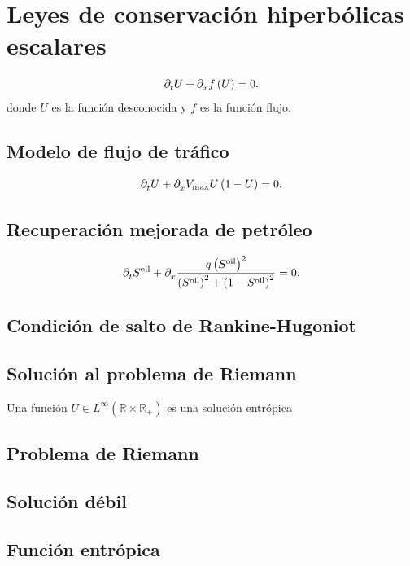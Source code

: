 \chapter{Leyes de conservación hiperbólicas escalares}

\begin{equation}
    \difcp{U}{t}+
    \difcp{f\left(U\right)}{x}=
    0.
\end{equation}
donde $U$ es la función desconocida y $f$ es la función flujo.

\section*{Modelo de flujo de tráfico}

\begin{equation}
    \difcp{U}{t}+
    \difcp{V_{\text{max}}U\left(1-U\right)}{x}=
    0.
\end{equation}

\section*{Recuperación mejorada de petróleo}

\begin{equation}
    \difcp{S^{\text{oil}}}{t}+
    \difcp{
        \frac{q\left(S^{\text{oil}}\right)^{2}}{\left(S^{\text{oil}}\right)^{2}+\left(1-S^{\text{oil}}\right)^{2}}
    }{x}=
    0.
\end{equation}

\section*{Condición de salto de Rankine-Hugoniot}

\section*{Solución al problema de Riemann}

Una función
$U\in L^{\infty}\left(\mathbb{R}\times\mathbb{R}_{+}\right)$
es una solución entrópica


\section{Problema de Riemann}
\section{Solución débil}
\section{Función entrópica}
